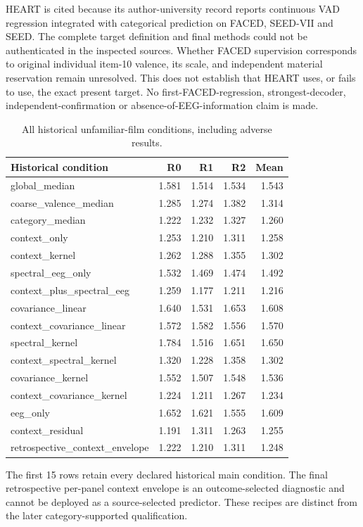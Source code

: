 \documentclass[10pt,a4paper]{article}
\begin{document}
HEART is cited because its author-university record reports continuous VAD regression integrated with categorical prediction on FACED, SEED-VII and SEED. The complete target definition and final methods could not be authenticated in the inspected sources. Whether FACED supervision corresponds to original individual item-10 valence, its scale, and independent material reservation remain unresolved. This does not establish that HEART uses, or fails to use, the exact present target. No first-FACED-regression, strongest-decoder, independent-confirmation or absence-of-EEG-information claim is made.

\clearpage
\begin{table}[tbp]
\centering
\small
\caption{All historical unfamiliar-film conditions, including adverse results.}
\label{tab:allconditions}
\begin{tabular}{lrrrr}
\toprule
Historical condition & R0 & R1 & R2 & Mean \\
\midrule
global\_median & 1.581 & 1.514 & 1.534 & 1.543 \\
coarse\_valence\_median & 1.285 & 1.274 & 1.382 & 1.314 \\
category\_median & 1.222 & 1.232 & 1.327 & 1.260 \\
context\_only & 1.253 & 1.210 & 1.311 & 1.258 \\
context\_kernel & 1.262 & 1.288 & 1.355 & 1.302 \\
spectral\_eeg\_only & 1.532 & 1.469 & 1.474 & 1.492 \\
context\_plus\_spectral\_eeg & 1.259 & 1.177 & 1.211 & 1.216 \\
covariance\_linear & 1.640 & 1.531 & 1.653 & 1.608 \\
context\_covariance\_linear & 1.572 & 1.582 & 1.556 & 1.570 \\
spectral\_kernel & 1.784 & 1.516 & 1.651 & 1.650 \\
context\_spectral\_kernel & 1.320 & 1.228 & 1.358 & 1.302 \\
covariance\_kernel & 1.552 & 1.507 & 1.548 & 1.536 \\
context\_covariance\_kernel & 1.224 & 1.211 & 1.267 & 1.234 \\
eeg\_only & 1.652 & 1.621 & 1.555 & 1.609 \\
context\_residual & 1.191 & 1.311 & 1.263 & 1.255 \\
retrospective\_context\_envelope & 1.222 & 1.210 & 1.311 & 1.248 \\
\bottomrule
\end{tabular}
\par\medskip\begin{minipage}{0.97\linewidth}\footnotesize The first 15 rows retain every declared historical main condition. The final retrospective per-panel context envelope is an outcome-selected diagnostic and cannot be deployed as a source-selected predictor. These recipes are distinct from the later category-supported qualification.\end{minipage}
\end{table}
\end{document}
